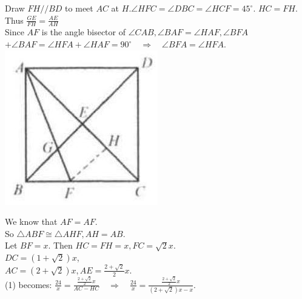\documentclass[10pt]{article}
\begin{document}
Draw \(F H / / B D\) to meet \(A C\) at \(H . \angle H F C=\angle D B C=\angle H C F=45^{\circ}\). \(H C=F H\).\\
Thus \(\frac{G E}{F H}=\frac{A E}{A H}\)\\
Since \(A F\) is the angle bisector of \(\angle C A B, \angle B A F=\angle H A F, \angle B F A\) \(+\angle B A F=\angle H F A+\angle H A F=90^{\circ} \quad \Rightarrow \quad \angle B F A=\angle H F A\).\\
\includegraphics[max width=\textwidth, center]{2025_04_17_97bc1f7e44d93c271a88g-109}

We know that \(A F=A F\).\\
So \(\triangle A B F \cong \triangle A H F, A H=A B\).\\
Let \(B F=x\). Then \(H C=F H=x, F C=\sqrt{2} x\).\\
\(D C=(1+\sqrt{2}) x\),\\
\(A C=(2+\sqrt{2}) x, A E=\frac{2+\sqrt{2}}{2} x\).\\
(1) becomes: \(\frac{24}{x}=\frac{\frac{2+\sqrt{2}}{2} x}{A C-H C} \quad \Rightarrow \quad \frac{24}{x}=\frac{\frac{2+\sqrt{2}}{2} x}{(2+\sqrt{2}) x-x}\).
\end{document}
